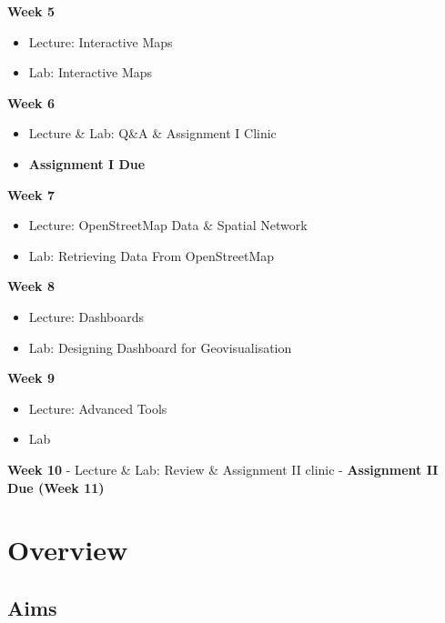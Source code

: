 \documentclass[
  letterpaper,
  DIV=11,
  numbers=noendperiod]{scrreprt}
\begin{document}
\textbf{Week 5}

\begin{itemize}
\item
  Lecture: Interactive Maps
\item
  Lab: Interactive Maps
\end{itemize}

\textbf{Week 6}

\begin{itemize}
\item
  Lecture \& Lab: Q\&A \& Assignment I Clinic
\item
  \textbf{Assignment I Due}
\end{itemize}

\textbf{Week 7}

\begin{itemize}
\item
  Lecture: OpenStreetMap Data \& Spatial Network
\item
  Lab: Retrieving Data From OpenStreetMap
\end{itemize}

\textbf{Week 8}

\begin{itemize}
\item
  Lecture: Dashboards
\item
  Lab: Designing Dashboard for Geovisualisation
\end{itemize}

\textbf{Week 9}

\begin{itemize}
\item
  Lecture: Advanced Tools
\item
  Lab
\end{itemize}

\textbf{Week 10} - Lecture \& Lab: Review \& Assignment II clinic -
\textbf{Assignment II Due (Week 11)}


\chapter*{Overview}\label{overview}


\section*{Aims}\label{aims}
\end{document}
